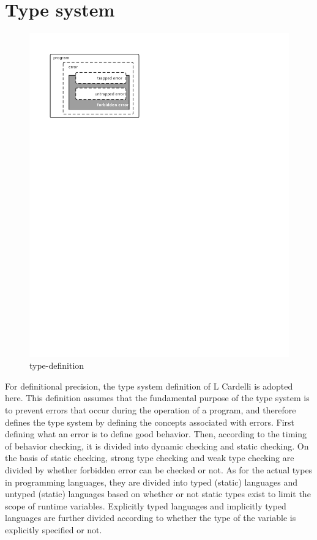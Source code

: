 \section{Type system}

\begin{figure}[htbp]
    \centerline{\includegraphics[scale=0.8]{figures/type-definition}}
    \caption{type-definition}
    \label{fig:type-definition}
\end{figure}


For definitional precision, the type system definition of L Cardelli is adopted here. This definition assumes that the fundamental purpose of the type system is to prevent errors that occur during the operation of a program, and therefore defines the type system by defining the concepts associated with errors. First defining what an error is to define good behavior. Then, according to the timing of behavior checking, it is divided into dynamic checking and static checking. On the basis of static checking, strong type checking and weak type checking are divided by whether forbidden error can be checked or not. As for the actual types in programming languages, they are divided into typed (static) languages and untyped (static) languages based on whether or not static types exist to limit the scope of runtime variables. Explicitly typed languages and implicitly typed languages are further divided according to whether the type of the variable is explicitly specified or not.

